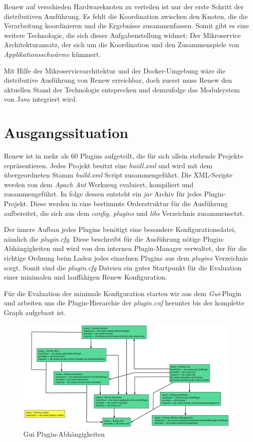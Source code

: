 Renew auf verschieden Hardwareknoten zu verteilen ist nur der erste Schritt der distributiven Ausführung. Es fehlt die Koordination zwischen den Knoten, die die Verarbeitung koordinieren und die Ergebnisse zusammenfassen. Somit gibt es eine weitere Technologie, die sich dieser Aufgabenstellung widmet: Der Mikroservice Architekturansatz, der sich um die Koordination und den Zusammenspiele von \textit{Applikationsschwärme} kümmert. \bigbreak

Mit Hilfe der Mikroservicearchitektur und der Docker-Umgebung wäre die distributive Ausführung von Renew erreichbar, doch zuerst muss Renew den aktuellen Stand der Technologie entsprechen und demzufolge das Modulsystem von Java integriert wird.  


\section{Ausgangssituation} \label{sec:ausgangssituation} 

Renew ist in mehr als 60 Plugins aufgeteilt, die für sich allein stehende Projekte repräsentieren. Jedes Projekt besitzt eine \textit{buidl.xml} und wird mit dem übergeordneten Stamm \textit{build.xml} Script zusammengeführt. Die XML-Scripte werden von dem \textit{Apach Ant} Werkzeug evaluiert, kompiliert und zusammengeführt. In folge dessen entsteht ein \textit{jar} Archiv für jedes Plugin-Projekt. Diese werden in eine bestimmte Orderstruktur für die Ausführung aufbereitet, die sich aus dem \textit{config, plugins} und \textit{libs} Verzeichnis zusammensetzt. 
\bigbreak

Der innere Aufbau jedes Plugins benötigt eine besondere Konfigurationsdatei, nämlich die \textit{plugin.cfg}. Diese beschreibt für die Ausführung nötige Plugin-Abhängigkeiten und wird von den internen Plugin-Manager verwaltet, der für die richtige Ordnung beim Laden jedes einzelnen Plugins aus dem \textit{plugins} Verzeichnis sorgt. Somit sind die \textit{plugin.cfg} Dateien ein guter Startpunkt für die Evaluation einer minimalen und lauffähigen Renew Konfiguration. 
\bigbreak

Für die Evaluation der minimale Konfiguration starten wir aus dem \textit{Gui}-Plugin und arbeiten uns die Plugin-Hierarchie der \textit{plugin.cnf} herunter bis der komplette Graph aufgebaut ist.

\begin{figure}[h!]
  \centering
  \includegraphics[width=\textwidth]{material/images/plugin_deps.png}
  \caption{Gui Plugin-Abhängigkeiten}
  \label{fig:plugin_deps}
\end{figure}

